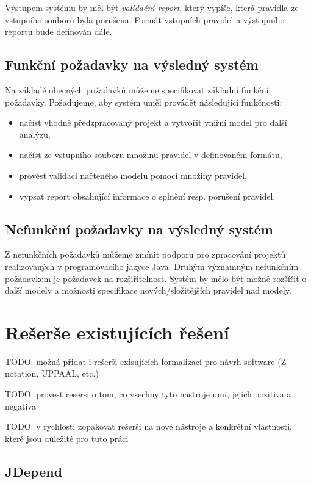 Výstupem systému by měl být \emph{validační report}, který vypíše, která pravidla ze vstupního souboru byla porušena. Formát vstupních pravidel a výstupního reportu bude definován dále.

\subsection{Funkční požadavky na výsledný systém}

Na základě obecných požadavků můžeme specifikovat základní funkční požadavky. Požadujeme, aby systém uměl provádět následující funkčnosti:
\begin{itemize}
\item načíst vhodně předzpracovaný projekt a vytvořit vniřní model pro další analýzu,
\item načíst ze vstupního souboru množinu pravidel v definovaném formátu,
\item provést validaci načteného modelu pomocí množiny pravidel,
\item vypsat report obsahující informace o splnění resp. porušení pravidel.
\end{itemize}

\subsection{Nefunkční požadavky na výsledný systém}
Z nefunkčních požadavků můžeme zmínit podporu pro zpracování projektů realizovaných v programovacího jazyce Java. Druhým významným nefunkčním požadavkem je požadavek na rozšiřitelnost. Systém by mělo být možné rozšířit o další modely a možnosti specifikace nových/složitějších pravidel nad modely.

\section{Rešerše existujících řešení}
\label{requirements-existing_tools}

TODO: možná přidat i rešerši exisujících formalizací pro návrh software (Z-notation, UPPAAL, etc.)

TODO: provest resersi o tom, co vsechny tyto nastroje umi, jejich pozitiva a negativa

TODO: v rychlosti zopakovat rešerši na nové nástroje a konkrétní vlastnosti, které jsou důležité pro tuto práci

\subsection{JDepend}

